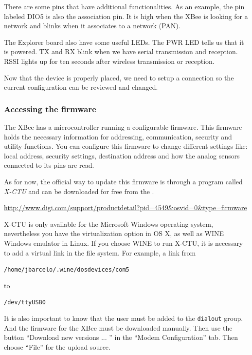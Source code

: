 There are some pins that have additional functionalities.
As an example, the pin labeled DIO5 is also the association pin.
It is high when the XBee is looking for a network and blinks when it associates to a network (PAN).

The Explorer board also have some useful LEDs.
The PWR LED tells us that it is powered.
TX and RX blink when we have serial transmission and reception.
RSSI lights up for ten seconds after wireless transmission or reception.

Now that the device is properly placed, we need to setup a connection so the current configuration can be reviewed and changed.

\subsubsection{Accessing the firmware}\label{xbeeRoleConfiguration}

The XBee has a microcontroller running a configurable firmware. This firmware holds the necessary information for addressing, communication, security and utility functions. You can configure this firmware to change different settings like: local address, security settings, destination address and how the analog sensors connected to its pins are read.

As for now, the official way to update this firmware is through a program called \emph{X-CTU} and can be downloaded for free from the \emph{}.

\emph{}

{\tiny \url{http://www.digi.com/support/productdetail?pid=4549&osvid=0&type=firmware}}

X-CTU is only available for the Microsoft Windows operating system, nevertheless you have the virtualization option in OS X, as well as WINE Windows emulator in Linux. 
If you choose WINE to run X-CTU, it is necessary to add a virtual link in the file system.
For example, a link from

\texttt{/home/jbarcelo/.wine/dosdevices/com5} 

to

\texttt{/dev/ttyUSB0}

It is also important to know that the user must be added to the \texttt{dialout} group.
And the firmware for the XBee must be downloaded manually.
Then use the button ``Download new versions ... '' in the ``Modem Configuration'' tab.
Then choose ``File'' for the upload source.

